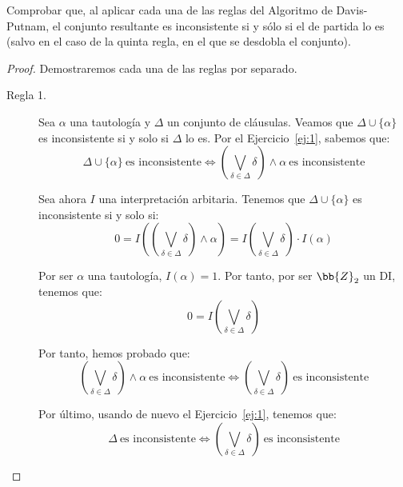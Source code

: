 \documentclass[12pt]{article}
\begin{document}
    
    \begin{ejercicio}\label{ej:2}
        Comprobar que, al aplicar cada una de las reglas del Algoritmo de Davis-Putnam, el conjunto resultante es inconsistente si y sólo si el de partida lo es (salvo en el caso de la quinta regla, en el que se desdobla el conjunto).
        \begin{proof}
            Demostraremos cada una de las reglas por separado.
            \begin{description}
                \item[Regla 1.] Sea $\alpha$ una tautología y $\Delta$ un conjunto de cláusulas.
                Veamos que $\Delta\cup \{\alpha\}$ es inconsistente si y solo si $\Delta$ lo es.
                Por el Ejercicio~\ref{ej:1}, sabemos que:
                \begin{equation*}
                    \Delta\cup \{\alpha\}\ \text{es inconsistente} \iff \left(\bigvee_{\delta \in \Delta} \delta\right) \land \alpha\ \text{es inconsistente}
                \end{equation*}

                Sea ahora $I$ una interpretación arbitaria. Tenemos que $\Delta\cup \{\alpha\}$ es inconsistente si y solo si:
                \begin{equation*}
                    0 = I\left(\left(\bigvee_{\delta \in \Delta} \delta\right) \land \alpha\right) = I\left(\bigvee_{\delta \in \Delta} \delta\right)\cdot I(\alpha)
                \end{equation*}

                Por ser $\alpha$ una tautología, $I(\alpha) = 1$. Por tanto, por ser $\bb{Z}_2$ un DI, tenemos que:
                \begin{equation*}
                    0 = I\left(\bigvee_{\delta \in \Delta} \delta\right)
                \end{equation*}

                Por tanto, hemos probado que:
                \begin{equation*}
                    \left(\bigvee_{\delta \in \Delta} \delta\right) \land \alpha\ \text{es inconsistente}
                    \iff \left(\bigvee_{\delta \in \Delta} \delta\right)\ \text{es inconsistente}
                \end{equation*}

                Por último, usando de nuevo el Ejercicio~\ref{ej:1}, tenemos que:
                \begin{equation*}
                    \Delta\ \text{es inconsistente} \iff \left(\bigvee_{\delta \in \Delta} \delta\right)\ \text{es inconsistente}
                \end{equation*}


\end{description}
\end{proof}
\end{ejercicio}
\end{document}
